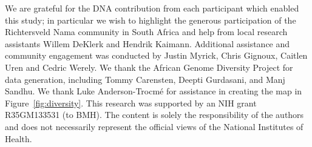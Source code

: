 \documentclass[]{article}
\begin{document}
We are grateful for the DNA contribution from each participant which enabled
this study; in particular we wish to highlight the generous participation of
the Richtersveld Nama community in South Africa and help from local research
assistants Willem DeKlerk and Hendrik Kaimann. Additional assistance and
community engagement was conducted by Justin Myrick, Chris Gignoux, Caitlen
Uren and Cedric Werely. We thank the African Genome Diversity Project for data
generation, including Tommy Carensten, Deepti Gurdasani, and Manj Sandhu. We
thank Luke Anderson-Trocm\'e for assistance in creating the map in
Figure~\ref{fig:diversity}. This research was supported by an NIH grant R35GM133531 (to
BMH). The content is solely the responsibility of the authors and does
not necessarily represent the official views of the National Institutes of
Health.



\end{document}
